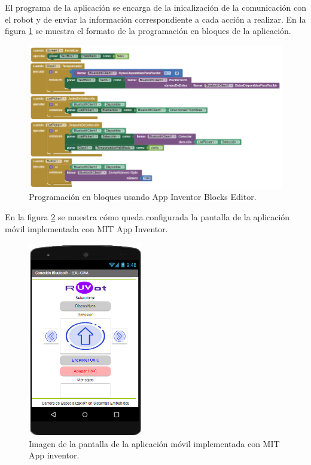 El programa de la aplicación se encarga de la inicalización de la comunicación con el robot y de enviar la información correspondiente a cada acción a realizar.
En la figura \ref{fig:mitapp} se muestra el formato de la programación en bloques de la aplicación.

\begin{figure}[h]
	\centering
	\includegraphics[width=14cm]{./Figures/mitapp.PNG}
	\caption{Programación en bloques usando App Inventor Blocks Editor.}
	\label{fig:mitapp}
\end{figure}
%

En la figura \ref{fig:pantalla} se muestra cómo queda configurada la pantalla de la aplicación móvil implementada con MIT App Inventor.

\begin{figure}[h]
	\centering
	\includegraphics[width=5cm]{./Figures/pantallaruvot2.PNG}
	\caption{Imagen de la pantalla de la aplicación móvil implementada con MIT App inventor.}
	\label{fig:pantalla}
\end{figure}


